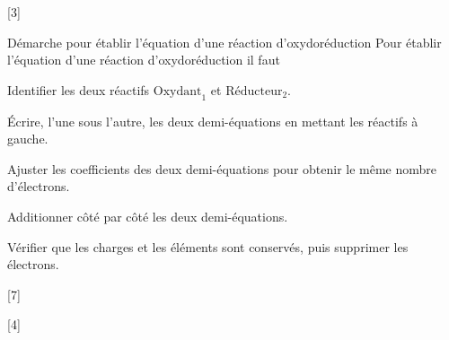 [3]


\begin{doc}{Démarche pour établir l'équation d'une réaction d'oxydoréduction}
  Pour établir l'équation d'une réaction d'oxydoréduction il faut
  \begin{listePoints}
    \item Identifier les deux réactifs $\text{Oxydant}_1$ et $\text{Réducteur}_2$.
    \item Écrire, l'une sous l'autre, les deux demi-équations en mettant les réactifs à gauche.
    \item Ajuster les coefficients des deux demi-équations pour obtenir le même nombre d'électrons.
    \item Additionner côté par côté les deux demi-équations.
    \item Vérifier que les charges et les éléments sont conservés, puis supprimer les électrons.
  \end{listePoints}
\end{doc}

[7]

[4]